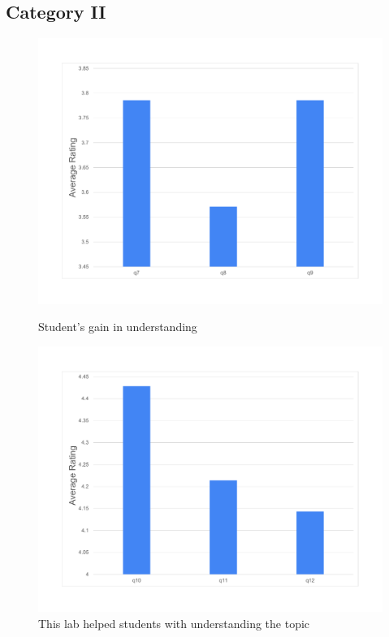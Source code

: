 \documentclass{article}
\begin{document}
\subsection{Category II}

\begin{figure}[!tbp]
\begin{minipage}[t]{0.45\textwidth}
\centering
\includegraphics[width=\textwidth]{9014_9.pdf}
\caption{Student's gain in understanding}\label{average charts/gain in understanding.pdf}
\end{minipage}
\begin{minipage}[t]{0.45\textwidth}
\centering
\includegraphics[width=\textwidth]{9014_10.pdf}
\caption{This lab helped students with understanding the topic}\label{average charts/help me understand.pdf}
\end{minipage}
\end{figure}
\end{document}
